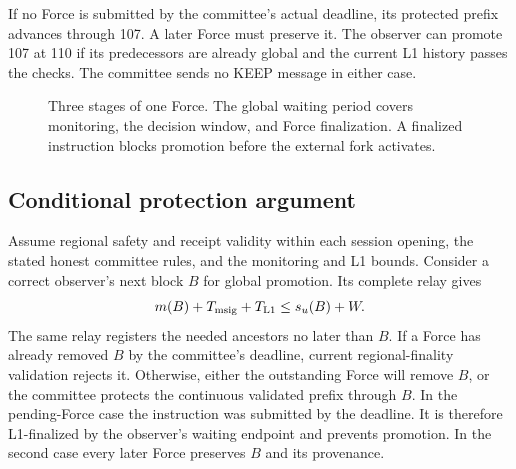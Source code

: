\documentclass[11pt,a4paper]{article}
\begin{document}
If no Force is submitted by the committee's actual deadline, its
protected prefix advances through 107. A later Force must preserve it.
The observer can promote 107 at 110 if its predecessors are already
global and the current L1 history passes the checks. The committee sends
no KEEP message in either case.

\begin{figure}[htbp]\centering
{}
\caption{Three stages of one Force. The global waiting period covers
monitoring, the decision window, and Force finalization. A finalized
instruction blocks promotion before the external fork activates.}
\label{fig:force-stages}
\end{figure}

\subsection{Conditional protection argument}
\label{sec:safety-argument}
Assume regional safety and receipt validity within each session opening,
the stated honest committee rules, and the monitoring and L1 bounds.
Consider a correct observer's next block $B$ for global promotion.
Its complete relay gives
\[
 m(B)+T_{\rm msig}+T_{\rm L1}
 \le s_u(B)+W.
\]
The same relay registers the needed ancestors no later than $B$.
If a Force has already removed $B$ by the committee's deadline, current
regional-finality validation rejects it. Otherwise, either the outstanding
Force will remove $B$, or the committee protects the continuous validated
prefix through $B$. In the pending-Force case the instruction was submitted
by the deadline. It is
therefore L1-finalized by the observer's waiting endpoint and prevents
promotion. In the second case every later Force preserves $B$ and its
provenance.
\end{document}
